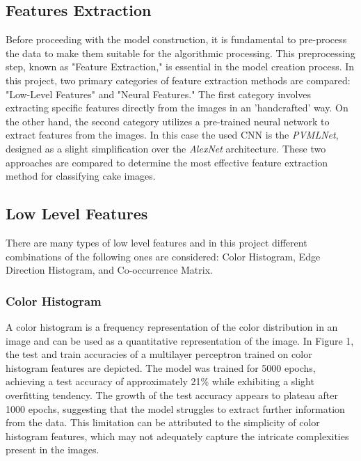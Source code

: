 \documentclass{article}
\begin{document}
\begin{multicols}{2}


\section{Features Extraction}
Before proceeding with the model construction, it is fundamental to pre-process the data to make them suitable for the algorithmic processing. This preprocessing step, known as 
"Feature Extraction," is essential in the model creation process.
In this project, two primary categories of feature extraction methods are compared: "Low-Level Features" and "Neural Features." The first category involves extracting specific 
features directly from the images in an 'handcrafted' way. On the other hand, the second category utilizes a pre-trained neural network to extract features from the images.
In this case the used CNN is the \textit{PVMLNet}, designed as a slight simplification over the \textit{AlexNet} architecture. 
These two approaches are compared to determine the most effective feature extraction method for classifying cake images.

\subsection{Low Level Features}
There are many types of low level features and in this project different combinations of the following ones are considered: Color Histogram, 
Edge Direction Histogram, and Co-occurrence Matrix.

\subsubsection{Color Histogram}
A color histogram is a frequency representation of the color distribution in an image and can be used as a quantitative representation of the image. In Figure 1, the test 
and train accuracies of a multilayer perceptron trained on color histogram features are depicted. The model was trained for 5000 epochs, achieving a test accuracy of 
approximately 21\% while exhibiting a slight overfitting tendency. The growth of the test accuracy appears to plateau after 1000 epochs, suggesting that the model 
struggles to extract further information from the data. This limitation can be attributed to the simplicity of color histogram features, which may not adequately 
capture the intricate complexities present in the images.


\end{multicols}
\end{document}
